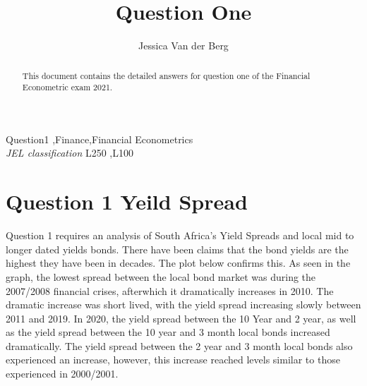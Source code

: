 \documentclass[11pt,preprint, authoryear]{elsarticle}
\numberwithin{equation}{section}
\numberwithin{figure}{section}
\numberwithin{table}{section}
\begin{document}
\begin{frontmatter}  %

\title{Question One}





\author[Add1]{Jessica Van der Berg}





\address[Add1]{Financial Econometrics 2021}


\begin{abstract}
\small{
This document contains the detailed answers for question one of the
Financial Econometric exam 2021.
}
\end{abstract}

\vspace{1cm}


\begin{keyword}
\footnotesize{
Question1 \sep Finance\sep Financial Econometrics \\
\vspace{0.3cm}
}
\footnotesize{
\textit{JEL classification} L250 \sep L100
}
\end{keyword}



\vspace{0.5cm}

\end{frontmatter}



\pagestyle{fancy}
\chead{}
\rhead{}
\lfoot{}
\lhead{}
\cfoot{}


\headsep 35pt %




\hypertarget{question-1-yeild-spread}{%
\section{\texorpdfstring{Question 1 Yeild Spread
\label{Introduction}}{Question 1 Yeild Spread }}\label{question-1-yeild-spread}}

Question 1 requires an analysis of South Africa's Yield Spreads and
local mid to longer dated yields bonds. There have been claims that the
bond yields are the highest they have been in decades. The plot below
confirms this. As seen in the graph, the lowest spread between the local
bond market was during the 2007/2008 financial crises, afterwhich it
dramatically increases in 2010. The dramatic increase was short lived,
with the yield spread increasing slowly between 2011 and 2019. In 2020,
the yield spread between the 10 Year and 2 year, as well as the yield
spread between the 10 year and 3 month local bonds increased
dramatically. The yield spread between the 2 year and 3 month local
bonds also experienced an increase, however, this increase reached
levels similar to those experienced in 2000/2001.
\end{document}
